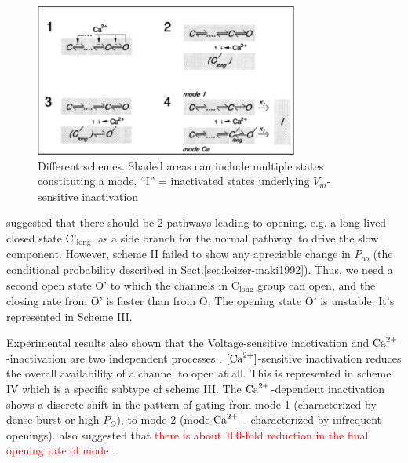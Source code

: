 \begin{figure}[hbt]
      \centerline{\includegraphics[height=5cm,
    angle=0]{./images/Imredy_models.eps}}
  \caption{Different schemes. Shaded areas can include multiple states
  constituting a mode. ``I'' = inactivated states underlying $V_m$-sensitive inactivation}
\label{fig:Imredy_LCC}
\end{figure}


\citep{imredy1994mcs} suggested that there should be 2 pathways leading to
opening, e.g. a long-lived closed state C'$_\text{long}$, as a side branch for
the normal pathway, to drive the slow component. However, scheme II failed to
show any apreciable change in $P_{oo}$ (the conditional probability described in
Sect.\ref{sec:keizer-maki1992}). Thus, we need a second open state O' to which
the channels in C$_\text{long}$ group can open, and the closing rate from O' is
faster than from O. The opening state O' is unstable. It's represented in Scheme
III.

Experimental results also shown that the Voltage-sensitive inactivation and
${\text{Ca}^{2+}}$-inactivation are two independent processes \citep{hadley1991}.
$[{\text{Ca}^{2+}}]$-sensitive inactivation reduces the overall availability of a channel to
open at all. This is represented in scheme IV which is a specific subtype of
scheme III. The ${\text{Ca}^{2+}}$-dependent inactivation shows a discrete shift in the
pattern of gating from mode 1 (characterized by dense burst or high  $P_O$), to
mode 2 (mode ${\text{Ca}^{2+}}$ - characterized by infrequent  openings).
\citep{imredy1994mcs} also suggested that \textcolor{red}{there is about
100-fold reduction in the final opening rate of mode }.

